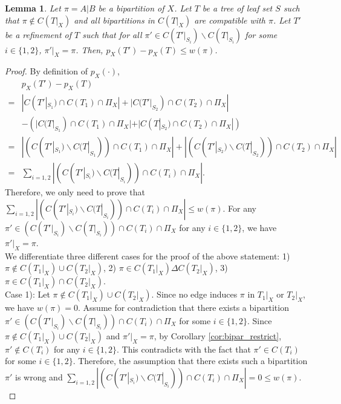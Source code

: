 \documentclass{article}
\newtheorem{lemma}{Lemma}
\begin{document}
\begin{lemma} \label{lem:one_bipar_upperbound}
    Let $\pi = A|B$ be a bipartition of $X$. Let $T$ be a tree of leaf set $S$ such that $\pi \notin C(T|_X)$ and all bipartitions in $C(T|_X)$ are compatible with $\pi$. Let $T'$ be a refinement of $T$ such that for all $\pi' \in C(T'|_{S_i}) \backslash C(T|_{S_i})$ for some $i \in \{1,2\}$, $\pi'|_X = \pi$. Then, $p_X(T') - p_X(T) \le w(\pi)$. 
\end{lemma}
\begin{proof}
    By definition of $p_X(\cdot)$, 
    \begin{align*}
        & p_X(T') - p_X(T) \\
        =& |C(T'|_{S_1}) \cap C(T_1) \cap \Pi_X| + |C(T'|_{S_2}) \cap C(T_2) \cap \Pi_X| \\
        &- (|C(T|_{S_1}) \cap C(T_1) \cap \Pi_X| + |C(T|_{S_2}) \cap C(T_2) \cap \Pi_X|) \\
        =& |(C(T'|_{S_1})\backslash C(T|_{S_1})) \cap C(T_1) \cap \Pi_X|+|(C(T'|_{S_2})\backslash C(T|_{S_2})) \cap C(T_2) \cap \Pi_X|\\
        =& \sum_{i = 1,2}|(C(T'|_{S_i})\backslash C(T|_{S_i})) \cap C(T_i) \cap \Pi_X|.
    \end{align*}
    Therefore, we only need to prove that $\sum_{i = 1,2}|(C(T'|_{S_i})\backslash C(T|_{S_i})) \cap C(T_i) \cap \Pi_X| \le w(\pi)$. For any $\pi' \in (C(T'|_{S_i})\backslash C(T|_{S_i})) \cap C(T_i) \cap \Pi_X$ for any $i \in \{1,2\}$, we have $\pi'|_X = \pi$. \\
    
    We differentiate three different cases for the proof of the above statement: 1) $\pi \notin C(T_1|_X)\cup C(T_2|_X)$, 2) $\pi \in C(T_1|_X) \Delta C(T_2|_X)$, 3) $\pi \in C(T_1|_X) \cap C(T_2|_X)$. \\
    
    Case 1): Let $\pi \notin C(T_1|_X)\cup C(T_2|_X)$. Since no edge induces $\pi$ in $T_1|_X$ or $T_2|_X$, we have $w(\pi) = 0$. Assume for contradiction that there exists a bipartition $\pi'\in (C(T'|_{S_i})\backslash C(T|_{S_i})) \cap C(T_i) \cap \Pi_X$ for some $i \in \{1,2\}$.  Since $\pi \notin C(T_1|_X)\cup C(T_2|_X)$ and $\pi'|_X = \pi$, by Corollary \ref{cor:bipar_restrict}, $\pi' \notin C(T_i)$ for any $i \in \{1,2\}$. This contradicts with the fact that $\pi' \in C(T_i)$ for some $i \in \{1,2\}$. Therefore, the assumption that there exists such a bipartition $\pi'$ is wrong and $\sum_{i = 1,2}|(C(T'|_{S_i})\backslash C(T|_{S_i})) \cap C(T_i) \cap \Pi_X| = 0 \le w(\pi)$.\\
    

\end{proof}
\end{document}
